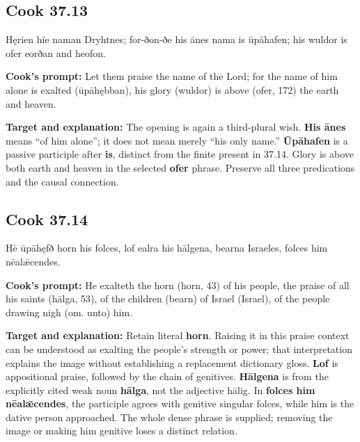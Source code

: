 \par\begin{minipage}{\linewidth}\raggedright
\subsection*{Cook 37.13}

Hęrien hīe naman Dryhtnes; for-ðon-ðe his ānes nama is ūpāhafen; his wuldor is ofer eorðan and heofon.

\textbf{Cook's prompt:} Let them praise the name of the Lord; for the name of him alone is exalted (ūpāhębban), his glory (wuldor) is above (ofer, 172) the earth and heaven.

\textbf{Target and explanation:} The opening is again a third-plural wish. \textbf{His ānes} means “of him alone”; it does not mean merely “his only name.” \textbf{Ūpāhafen} is a passive participle after \textbf{is}, distinct from the finite present in 37.14. Glory is above both earth and heaven in the selected \textbf{ofer} phrase. Preserve all three predications and the causal connection.

\end{minipage}\par\addvspace{4pt}

\par\begin{minipage}{\linewidth}\raggedright
\subsection*{Cook 37.14}

Hē ūpāhęfð horn his folces, lof ealra his hālgena, bearna Israeles, folces him nēalǣcendes.

\textbf{Cook's prompt:} He exalteth the horn (horn, 43) of his people, the praise of all his saints (hālga, 53), of the children (bearn) of Israel (Israel), of the people drawing nigh (om. unto) him.

\textbf{Target and explanation:} Retain literal \textbf{horn}. Raising it in this praise context can be understood as exalting the people's strength or power; that interpretation explains the image without establishing a replacement dictionary gloss. \textbf{Lof} is appositional praise, followed by the chain of genitives. \textbf{Hālgena} is from the explicitly cited weak noun \textbf{hālga}, not the adjective hālig. In \textbf{folces him nēalǣcendes}, the participle agrees with genitive singular folces, while him is the dative person approached. The whole dense phrase is supplied; removing the image or making him genitive loses a distinct relation.

\end{minipage}\par\addvspace{4pt}


